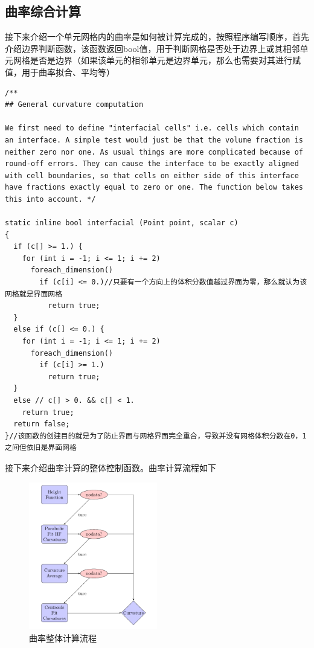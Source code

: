 \documentclass[lang=cn,11pt,a4paper]{elegantpaper}
\begin{document}
\subsection{曲率综合计算}
接下来介绍一个单元网格内的曲率是如何被计算完成的，按照程序编写顺序，首先介绍边界判断函数，该函数返回bool值，用于判断网格是否处于边界上或其相邻单元网格是否是边界（如果该单元的相邻单元是边界单元，那么也需要对其进行赋值，用于曲率拟合、平均等）
\begin{verbatim}
/**
## General curvature computation

We first need to define "interfacial cells" i.e. cells which contain
an interface. A simple test would just be that the volume fraction is
neither zero nor one. As usual things are more complicated because of
round-off errors. They can cause the interface to be exactly aligned
with cell boundaries, so that cells on either side of this interface
have fractions exactly equal to zero or one. The function below takes
this into account. */

static inline bool interfacial (Point point, scalar c)
{
  if (c[] >= 1.) {
    for (int i = -1; i <= 1; i += 2)
      foreach_dimension()
        if (c[i] <= 0.)//只要有一个方向上的体积分数值越过界面为零，那么就认为该网格就是界面网格
          return true;
  }
  else if (c[] <= 0.) {
    for (int i = -1; i <= 1; i += 2)
      foreach_dimension()
        if (c[i] >= 1.)
          return true;
  }
  else // c[] > 0. && c[] < 1.
    return true;
  return false;
}//该函数的创建目的就是为了防止界面与网格界面完全重合，导致并没有网格体积分数在0，1之间但依旧是界面网格
\end{verbatim}
接下来介绍曲率计算的整体控制函数。曲率计算流程如下
\begin{figure}[h]
    \centering
    \includegraphics[width=0.5\textwidth]{image/workflow2.pdf}
    \caption{曲率整体计算流程}
\end{figure}
\end{document}
